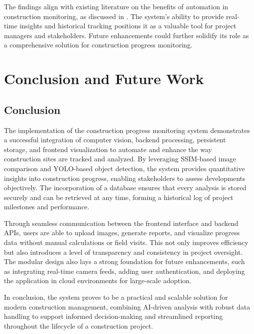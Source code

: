 \documentclass[12pt,a4paper]{report}
\begin{document}
The findings align with existing literature on the benefits of automation in construction monitoring, as discussed in \cite{Sample2023}. The system's ability to provide real-time insights and historical tracking positions it as a valuable tool for project managers and stakeholders. Future enhancements could further solidify its role as a comprehensive solution for construction progress monitoring.

\chapter{Conclusion and Future Work}

\section{Conclusion}
The implementation of the construction progress monitoring system demonstrates a successful integration of computer vision, backend processing, persistent storage, and frontend visualization to automate and enhance the way construction sites are tracked and analyzed. By leveraging SSIM-based image comparison and YOLO-based object detection, the system provides quantitative insights into construction progress, enabling stakeholders to assess developments objectively. The incorporation of a database ensures that every analysis is stored securely and can be retrieved at any time, forming a historical log of project milestones and performance.

Through seamless communication between the frontend interface and backend APIs, users are able to upload images, generate reports, and visualize progress data without manual calculations or field visits. This not only improves efficiency but also introduces a level of transparency and consistency in project oversight. The modular design also lays a strong foundation for future enhancements, such as integrating real-time camera feeds, adding user authentication, and deploying the application in cloud environments for large-scale adoption.

In conclusion, the system proves to be a practical and scalable solution for modern construction management, combining AI-driven analysis with robust data handling to support informed decision-making and streamlined reporting throughout the lifecycle of a construction project.
\end{document}
